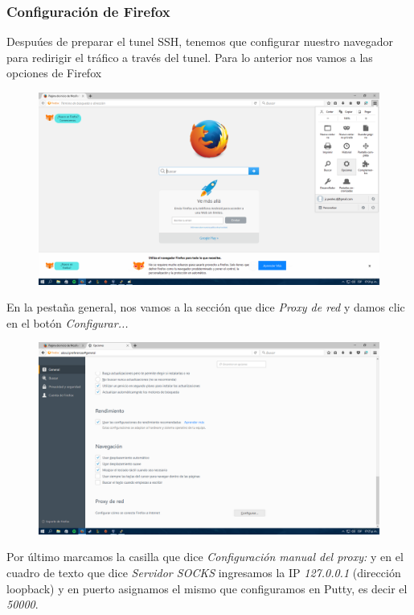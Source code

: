 \documentclass{article}
\begin{document}
\subsubsection{Configuraci\'on de Firefox}

Despu\'ues de preparar el tunel SSH, tenemos que configurar nuestro navegador para redirigir el tr\'afico a trav\'es del tunel. Para lo anterior nos vamos a las opciones de Firefox

\begin{figure}[H]
\centering
\includegraphics[width=1\textwidth]{11-OPCIONESFIREFOX}
\end{figure}

En la pestaña general, nos vamos a la secci\'on que dice \emph{Proxy de red} y damos clic en el bot\'on \emph{Configurar...}

\begin{figure}[H]
\centering
\includegraphics[width=1\textwidth]{12-CONFIGURACIONPROXY}
\end{figure}

Por \'ultimo marcamos la casilla que dice \emph{Configuraci\'on manual del proxy:} y en el cuadro de texto que dice \emph{Servidor SOCKS} ingresamos la IP \emph{127.0.0.1} (direcci\'on loopback) y en puerto asignamos el mismo que configuramos en Putty, es decir el \emph{50000}. 
\end{document}
